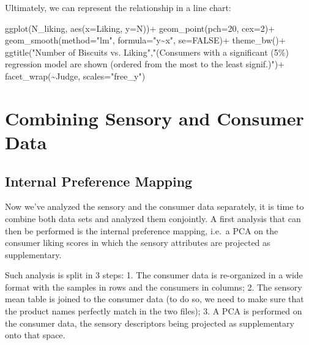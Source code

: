 \documentclass[
]{book}
\newenvironment{Shaded}{\begin{snugshade}}{\end{snugshade}}
\newcommand{\AttributeTok}[1]{\textcolor[rgb]{0.77,0.63,0.00}{#1}}
\newcommand{\ConstantTok}[1]{\textcolor[rgb]{0.00,0.00,0.00}{#1}}
\newcommand{\DecValTok}[1]{\textcolor[rgb]{0.00,0.00,0.81}{#1}}
\newcommand{\FunctionTok}[1]{\textcolor[rgb]{0.00,0.00,0.00}{#1}}
\newcommand{\NormalTok}[1]{#1}
\newcommand{\SpecialCharTok}[1]{\textcolor[rgb]{0.00,0.00,0.00}{#1}}
\newcommand{\StringTok}[1]{\textcolor[rgb]{0.31,0.60,0.02}{#1}}
\begin{document}
Ultimately, we can represent the relationship in a line chart:

\begin{Shaded}
\begin{Highlighting}[]
\FunctionTok{ggplot}\NormalTok{(N\_liking, }\FunctionTok{aes}\NormalTok{(}\AttributeTok{x=}\NormalTok{Liking, }\AttributeTok{y=}\NormalTok{N))}\SpecialCharTok{+}
  \FunctionTok{geom\_point}\NormalTok{(}\AttributeTok{pch=}\DecValTok{20}\NormalTok{, }\AttributeTok{cex=}\DecValTok{2}\NormalTok{)}\SpecialCharTok{+}
  \FunctionTok{geom\_smooth}\NormalTok{(}\AttributeTok{method=}\StringTok{"lm"}\NormalTok{, }\AttributeTok{formula=}\StringTok{"y\textasciitilde{}x"}\NormalTok{, }\AttributeTok{se=}\ConstantTok{FALSE}\NormalTok{)}\SpecialCharTok{+}
  \FunctionTok{theme\_bw}\NormalTok{()}\SpecialCharTok{+}
  \FunctionTok{ggtitle}\NormalTok{(}\StringTok{"Number of Biscuits vs. Liking"}\NormalTok{,}\StringTok{"(Consumers with a significant (5\%) regression model are shown (ordered from the most to the least signif.)"}\NormalTok{)}\SpecialCharTok{+}
  \FunctionTok{facet\_wrap}\NormalTok{(}\SpecialCharTok{\textasciitilde{}}\NormalTok{Judge, }\AttributeTok{scales=}\StringTok{"free\_y"}\NormalTok{)}
\end{Highlighting}
\end{Shaded}

\hypertarget{combining-sensory-and-consumer-data}{%
\section{Combining Sensory and Consumer Data}\label{combining-sensory-and-consumer-data}}

\hypertarget{internal-preference-mapping}{%
\subsection{Internal Preference Mapping}\label{internal-preference-mapping}}

Now we've analyzed the sensory and the consumer data separately, it is time to combine both data sets and analyzed them conjointly. A first analysis that can then be performed is the internal preference mapping, i.e.~a PCA on the consumer liking scores in which the sensory attributes are projected as supplementary.

Such analysis is split in 3 steps:
1. The consumer data is re-organized in a wide format with the samples in rows and the consumers in columns;
2. The sensory mean table is joined to the consumer data (to do so, we need to make sure that the product names perfectly match in the two files);
3. A PCA is performed on the consumer data, the sensory descriptors being projected as supplementary onto that space.
\end{document}
